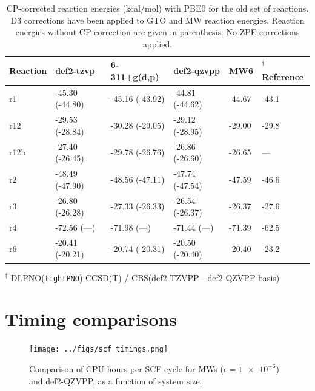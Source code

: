 \documentclass[11pt,a4paper]{article}
\begin{document}
\begin{table}[H]
	\centering
	\label{tab: rxn energies old pbe0}
	\caption{CP-corrected reaction energies (\si{kcal/mol}) with PBE0 for the old set of reactions. D3 corrections have been applied to GTO and MW reaction energies. Reaction energies without CP-correction are given in parenthesis. No ZPE corrections applied.}
	\begin{threeparttable}
	\begin{tabular}{l l l l l l}
		\toprule
		Reaction & def2-tzvp       & 6-311+g(d,p)    & def2-qzvpp      & MW6    & $^\dagger$Reference \parencite{dohm2018} \\ 
		\midrule
		r1       & -45.30 (-44.80) & -45.16 (-43.92) & -44.81 (-44.62) & -44.67 & -43.1                          \\
		r12      & -29.53 (-28.84) & -30.28 (-29.05) & -29.12 (-28.95) & -29.00 & -29.8                          \\
		r12b     & -27.40 (-26.45) & -29.78 (-26.76) & -26.86 (-26.60) & -26.65 & ---                               \\
		r2       & -48.49 (-47.90) & -48.56 (-47.11) & -47.74 (-47.54) & -47.59 & -46.6                          \\
		r3       & -26.80 (-26.28) & -27.33 (-26.33) & -26.54 (-26.37) & -26.37 & -27.6                          \\
		r4       & -72.56 (---)    & -71.98 (---)    & -71.44 (---)    & -71.39 & -62.5                    					      \\
		r6       & -20.41 (-20.21) & -20.74 (-20.31) & -20.50 (-20.40) & -20.40 & -23.2                          \\ 
		\bottomrule
	\end{tabular}
\begin{tablenotes}
	\item $^\dagger$ DLPNO(\verb|tightPNO|)-CCSD(T) / CBS(def2-TZVPP---def2-QZVPP basis)
\end{tablenotes}

\end{threeparttable}
\end{table}

\section{Timing comparisons}

\begin{figure}[H]
	\centering
	\texttt{[image: ../figs/scf\_timings.png]}
	\caption{Comparison of CPU hours per SCF cycle for MWs ($\epsilon = \num{1e-6}$) and def2-QZVPP, as a function of system size.}
	\label{fig: }
\end{figure}
	

\printbibliography


\end{document}
